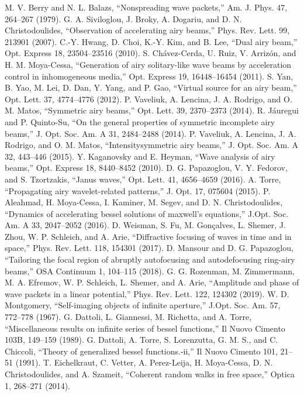 \documentclass[aps,pra,reprint,superscriptaddress]{revtex4-2}
\begin{document}
\begin{thebibliography}{9}
 M. V. Berry and N. L. Balazs, “Nonspreading wave packets,” Am. J.
Phys. 47, 264–267 (1979).
 G. A. Siviloglou, J. Broky, A. Dogariu, and D. N. Christodoulides, “Observation
of accelerating airy beams,” Phys. Rev. Lett. 99, 213901
(2007).
 C.-Y. Hwang, D. Choi, K.-Y. Kim, and B. Lee, “Dual airy beam,” Opt.
Express 18, 23504–23516 (2010).
 S. Chávez-Cerda, U. Ruiz, V. Arrizón, and H. M. Moya-Cessa, “Generation
of airy solitary-like wave beams by acceleration control in inhomogeneous
media,” Opt. Express 19, 16448–16454 (2011).
 S. Yan, B. Yao, M. Lei, D. Dan, Y. Yang, and P. Gao, “Virtual source for
an airy beam,” Opt. Lett. 37, 4774–4776 (2012).
 P. Vaveliuk, A. Lencina, J. A. Rodrigo, and O. M. Matos, “Symmetric
airy beams,” Opt. Lett. 39, 2370–2373 (2014).
 R. Jáuregui and P. Quinto-Su, “On the general properties of symmetric
incomplete airy beams,” J. Opt. Soc. Am. A 31, 2484–2488 (2014).
 P. Vaveliuk, A. Lencina, J. A. Rodrigo, and O. M. Matos, “Intensitysymmetric
airy beams,” J. Opt. Soc. Am. A 32, 443–446 (2015).
 Y. Kaganovsky and E. Heyman, “Wave analysis of airy beams,” Opt.
Express 18, 8440–8452 (2010).
 D. G. Papazoglou, V. Y. Fedorov, and S. Tzortzakis, “Janus waves,” Opt.
Lett. 41, 4656–4659 (2016).
 A. Torre, “Propagating airy wavelet-related patterns,” J. Opt. 17, 075604
(2015).
 P. Aleahmad, H. Moya-Cessa, I. Kaminer, M. Segev, and D. N.
Christodoulides, “Dynamics of accelerating bessel solutions of
maxwell’s equations,” J.Opt. Soc. Am. A 33, 2047–2052 (2016).
 D. Weisman, S. Fu, M. Gonçalves, L. Shemer, J. Zhou, W. P. Schleich,
and A. Arie, “Diffractive focusing of waves in time and in space,” Phys.
Rev. Lett. 118, 154301 (2017).
 D. Mansour and D. G. Papazoglou, “Tailoring the focal region of abruptly
autofocusing and autodefocusing ring-airy beams,” OSA Continuum 1,
104–115 (2018).
 G. G. Rozenman, M. Zimmermann, M. A. Efremov, W. P. Schleich,
L. Shemer, and A. Arie, “Amplitude and phase of wave packets in a
linear potential,” Phys. Rev. Lett. 122, 124302 (2019).
 W. D. Montgomery, “Self-imaging objects of infinite aperture,” J.Opt.
Soc. Am. 57, 772–778 (1967).
 G. Dattoli, L. Giannessi, M. Richetta, and A. Torre, “Miscellaneous
results on infinite series of bessel functions,” Il Nuovo Cimento 103B,
149–159 (1989).
 G. Dattoli, A. Torre, S. Lorenzutta, G. M. S., and C. Chiccoli, “Theory of
generalized bessel functions.-ii,” Il Nuovo Cimento 101, 21–51 (1991).
 T. Eichelkraut, C. Vetter, A. Perez-Leija, H. Moya-Cessa, D. N.
Christodoulides, and A. Szameit, “Coherent random walks in free
space,” Optica 1, 268–271 (2014).


\end{thebibliography}
\end{document}
